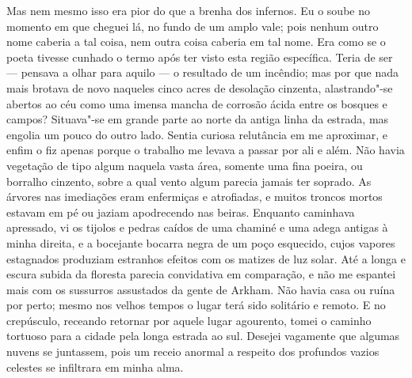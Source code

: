 Mas nem mesmo isso era pior do que a brenha dos infernos. Eu o soube no
momento em que cheguei lá, no fundo de um amplo vale; pois nenhum outro
nome caberia a tal coisa, nem outra coisa caberia em tal nome. Era como
se o poeta tivesse cunhado o termo após ter visto esta região
específica. Teria de ser --- pensava a olhar para aquilo --- o resultado
de um incêndio; mas por que nada mais brotava de novo naqueles cinco
acres de desolação cinzenta, alastrando"-se abertos ao céu como uma
imensa mancha de corrosão ácida entre os bosques e campos? Situava"-se em
grande parte ao norte da antiga linha da estrada, mas engolia um pouco
do outro lado. Sentia curiosa relutância em me aproximar, e enfim o fiz
apenas porque o trabalho me levava a passar por ali e além. Não havia
vegetação de tipo algum naquela vasta área, somente uma fina poeira, ou
borralho cinzento, sobre a qual vento algum parecia jamais ter soprado.
As árvores nas imediações eram enfermiças e atrofiadas, e muitos troncos
mortos estavam em pé ou jaziam apodrecendo nas beiras. Enquanto
caminhava apressado, vi os tijolos e pedras caídos de uma chaminé e uma
adega antigas à minha direita, e a bocejante bocarra negra de um poço
esquecido, cujos vapores estagnados produziam estranhos efeitos com os
matizes de luz solar. Até a longa e escura subida da floresta parecia
convidativa em comparação, e não me espantei mais com os sussurros
assustados da gente de Arkham. Não havia casa ou ruína por perto; mesmo
nos velhos tempos o lugar terá sido solitário e remoto. E no crepúsculo,
receando retornar por aquele lugar agourento, tomei o caminho tortuoso
para a cidade pela longa estrada ao sul. Desejei vagamente que algumas
nuvens se juntassem, pois um receio anormal a respeito dos profundos
vazios celestes se infiltrara em minha alma.

